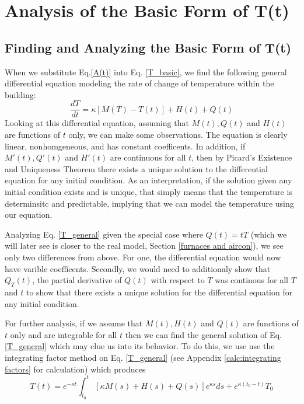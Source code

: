 \documentclass[titlepage]{article}
\begin{document}
\section{Analysis of the Basic Form of T(t)}

\subsection{Finding and Analyzing the Basic Form of T(t)}\label{Linear T(t)}
When we substitute Eq.\eqref{A(t)} into Eq. \eqref{T_basic}, we find the following general differential 
equation modeling the rate of change of temperature within the building:
\begin{equation}\label{T_general}
    \frac{dT}{dt} = \kappa[M(T)-T(t)] + H(t) + Q(t) 
\end{equation}
Looking at this differential equation, assuming that $M(t), Q(t)$ and $H(t)$ are functions of $t$ only, 
we can make some observations. The equation is clearly linear, nonhomgeneous, and has constant coefficents. 
In addition, if $M'(t), Q'(t)$ and $H'(t)$ are continuous for all $t$, then by Picard's Existence and Uniqueness
Theorem there exists a unique solution to the differential equation for 
any initial condition. As an interpretation, if the solution given any initial condition exists and is unique, that simply
means that the temperature is determinsitc and predictable, implying that we can model the temperature using our equation.

Analyzing Eq. \eqref{T_general} given the special case where $Q(t) = tT$ (which we will later see is closer to the 
real model, Section \ref{furnaces and aircon}), we see only two differences from above. For one, the differential equation
would now have varible coefficents. Secondly, we would need to additionaly show that $Q_T(t)$, the partial derivative of $Q(t)$ 
with respect to $T$ was continous for all $T$ and $t$ to show that there exists a unique solution for the differential equation for 
any initial condition.


For further analysis, if we assume that  $M(t), H(t)$ and $Q(t)$ are functions of $t$ only
and are integrable for all $t$ then we can find the general solution of Eq. \eqref{T_general}
which may clue us into its behavior. To do this, we use use the integrating factor method on
Eq. \eqref{T_general} (see Appendix \ref{calc:integrating factors} for calculation) which produces
\begin{equation}\label{eq:integrating factor}
    T(t) = e^{-\kappa t}\int _{t_0}^t\:[\kappa M(s)+H(s)+Q(s)]e^{\kappa s}ds +e^{\kappa (t_0-t)} T_0        
\end{equation}
\end{document}
